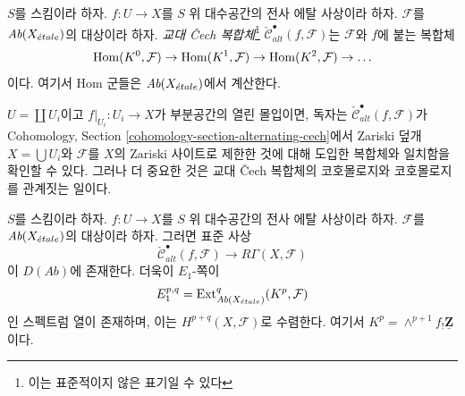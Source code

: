 \begin{definition}
\label{definition-alternating-cech-complex}
$S$를 스킴이라 하자. $f : U \to X$를 $S$ 위 대수공간의 전사 에탈
사상이라 하자. $\mathcal{F}$를 $\textit{Ab}(X_{\acute{e}tale})$의 대상이라
하자. {\it 교대 {\v C}ech 복합체}\footnote{이는 표준적이지 않은 표기일 수 있다}
$\check{\mathcal{C}}^\bullet_{alt}(f, \mathcal{F})$는 $\mathcal{F}$와
$f$에 붙는 복합체
$$
\mathop{\mathrm{Hom}}\nolimits(K^0, \mathcal{F}) \to \mathop{\mathrm{Hom}}\nolimits(K^1, \mathcal{F}) \to
\mathop{\mathrm{Hom}}\nolimits(K^2, \mathcal{F}) \to \ldots
$$
이다. 여기서 Hom 군들은 $\textit{Ab}(X_{\acute{e}tale})$에서 계산한다.
\end{definition}

\noindent
$U = \coprod U_i$이고 $f|_{U_i} : U_i \to X$가 부분공간의 열린
몰입이면, 독자는 $\check{\mathcal{C}}_{alt}^\bullet(f, \mathcal{F})$가
Cohomology, Section \ref{cohomology-section-alternating-cech}에서
Zariski 덮개 $X = \bigcup U_i$와 $\mathcal{F}$를 $X$의 Zariski
사이트로 제한한 것에 대해 도입한 복합체와 일치함을 확인할 수 있다.
그러나 더 중요한 것은 교대 {\v C}ech 복합체의 코호몰로지와
코호몰로지를 관계짓는 일이다.

\begin{lemma}
\label{lemma-alternating-cech-to-cohomology}
$S$를 스킴이라 하자. $f : U \to X$를 $S$ 위 대수공간의 전사 에탈
사상이라 하자. $\mathcal{F}$를 $\textit{Ab}(X_{\acute{e}tale})$의 대상이라
하자. 그러면 표준 사상
$$
\check{\mathcal{C}}^\bullet_{alt}(f, \mathcal{F})
\longrightarrow
R\Gamma(X, \mathcal{F})
$$
이 $D(\textit{Ab})$에 존재한다. 더욱이 $E_1$-쪽이
$$
E_1^{p, q} =
\mathop{\mathrm{Ext}}\nolimits_{\textit{Ab}(X_{\acute{e}tale})}^q(K^p, \mathcal{F})
$$
인 스펙트럼 열이 존재하며, 이는 $H^{p + q}(X, \mathcal{F})$로
수렴한다. 여기서 $K^p = \wedge^{p + 1}f_!\underline{\mathbf{Z}}$이다.
\end{lemma}

